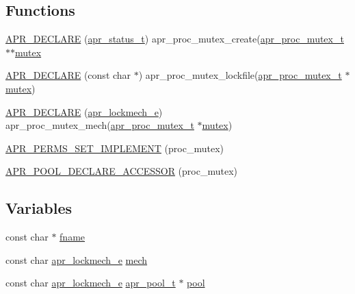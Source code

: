 \subsection*{Functions}
\begin{DoxyCompactItemize}
\item 
\hyperlink{group__apr__proc__mutex_ga68b3c38e414c0f369d573694c3923326}{A\+P\+R\+\_\+\+D\+E\+C\+L\+A\+RE} (\hyperlink{group__apr__errno_gaa5105fa83cc322f09382292db8b47593}{apr\+\_\+status\+\_\+t}) apr\+\_\+proc\+\_\+mutex\+\_\+create(\hyperlink{structapr__proc__mutex__t}{apr\+\_\+proc\+\_\+mutex\+\_\+t} $\ast$$\ast$\hyperlink{group__apr__thread__cond_ga9b5d997217b2ae4c884c535811cb6e35}{mutex}
\item 
\hyperlink{group__apr__proc__mutex_ga6c075452682e5c1427107a9e1e21530a}{A\+P\+R\+\_\+\+D\+E\+C\+L\+A\+RE} (const char $\ast$) apr\+\_\+proc\+\_\+mutex\+\_\+lockfile(\hyperlink{structapr__proc__mutex__t}{apr\+\_\+proc\+\_\+mutex\+\_\+t} $\ast$\hyperlink{group__apr__thread__cond_ga9b5d997217b2ae4c884c535811cb6e35}{mutex})
\item 
\hyperlink{group__apr__proc__mutex_gad72af031f0f76e6a23551f00e2b9da9e}{A\+P\+R\+\_\+\+D\+E\+C\+L\+A\+RE} (\hyperlink{group__apr__proc__mutex_ga75dd95a48a1e855a87b509b522746ed4}{apr\+\_\+lockmech\+\_\+e}) apr\+\_\+proc\+\_\+mutex\+\_\+mech(\hyperlink{structapr__proc__mutex__t}{apr\+\_\+proc\+\_\+mutex\+\_\+t} $\ast$\hyperlink{group__apr__thread__cond_ga9b5d997217b2ae4c884c535811cb6e35}{mutex})
\item 
\hyperlink{group__apr__proc__mutex_ga160e03376aafa98c41639d7917c97e98}{A\+P\+R\+\_\+\+P\+E\+R\+M\+S\+\_\+\+S\+E\+T\+\_\+\+I\+M\+P\+L\+E\+M\+E\+NT} (proc\+\_\+mutex)
\item 
\hyperlink{group__apr__proc__mutex_gacfbfc453323a4f81b12d537f9d0a3df3}{A\+P\+R\+\_\+\+P\+O\+O\+L\+\_\+\+D\+E\+C\+L\+A\+R\+E\+\_\+\+A\+C\+C\+E\+S\+S\+OR} (proc\+\_\+mutex)
\end{DoxyCompactItemize}
\subsection*{Variables}
\begin{DoxyCompactItemize}
\item 
const char $\ast$ \hyperlink{group__apr__proc__mutex_ga6a2fc0c236288b07ce5bd1335ca89fa2}{fname}
\item 
const char \hyperlink{group__apr__proc__mutex_ga75dd95a48a1e855a87b509b522746ed4}{apr\+\_\+lockmech\+\_\+e} \hyperlink{group__apr__proc__mutex_gac5f6e658672b8579da569b97a6ae82a2}{mech}
\item 
const char \hyperlink{group__apr__proc__mutex_ga75dd95a48a1e855a87b509b522746ed4}{apr\+\_\+lockmech\+\_\+e} \hyperlink{structapr__pool__t}{apr\+\_\+pool\+\_\+t} $\ast$ \hyperlink{group__apr__proc__mutex_ga51fbc0d90e2519e2e42e03c5dd9f441b}{pool}
\end{DoxyCompactItemize}


